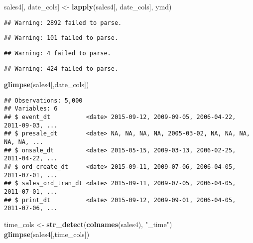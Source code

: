 \documentclass[]{article}
\newenvironment{Shaded}{\begin{snugshade}}{\end{snugshade}}
\newcommand{\KeywordTok}[1]{\textcolor[rgb]{0.13,0.29,0.53}{\textbf{#1}}}
\newcommand{\NormalTok}[1]{#1}
\newcommand{\StringTok}[1]{\textcolor[rgb]{0.31,0.60,0.02}{#1}}
\begin{document}
\begin{Shaded}
\begin{Highlighting}[]
\NormalTok{sales4[, date_cols] <-}\StringTok{ }\KeywordTok{lapply}\NormalTok{(sales4[, date_cols], ymd)}
\end{Highlighting}
\end{Shaded}

\begin{verbatim}
## Warning: 2892 failed to parse.
\end{verbatim}

\begin{verbatim}
## Warning: 101 failed to parse.
\end{verbatim}

\begin{verbatim}
## Warning: 4 failed to parse.
\end{verbatim}

\begin{verbatim}
## Warning: 424 failed to parse.
\end{verbatim}

\begin{Shaded}
\begin{Highlighting}[]
\KeywordTok{glimpse}\NormalTok{(sales4[,date_cols])}
\end{Highlighting}
\end{Shaded}

\begin{verbatim}
## Observations: 5,000
## Variables: 6
## $ event_dt          <date> 2015-09-12, 2009-09-05, 2006-04-22, 2011-09-03, ...
## $ presale_dt        <date> NA, NA, NA, NA, 2005-03-02, NA, NA, NA, NA, NA, ...
## $ onsale_dt         <date> 2015-05-15, 2009-03-13, 2006-02-25, 2011-04-22, ...
## $ ord_create_dt     <date> 2015-09-11, 2009-07-06, 2006-04-05, 2011-07-01, ...
## $ sales_ord_tran_dt <date> 2015-09-11, 2009-07-05, 2006-04-05, 2011-07-01, ...
## $ print_dt          <date> 2015-09-12, 2009-09-01, 2006-04-05, 2011-07-06, ...
\end{verbatim}

\begin{Shaded}
\begin{Highlighting}[]
\NormalTok{time_cols <-}\StringTok{ }\KeywordTok{str_detect}\NormalTok{(}\KeywordTok{colnames}\NormalTok{(sales4), }\StringTok{"_time"}\NormalTok{)}
\KeywordTok{glimpse}\NormalTok{(sales4[,time_cols])}
\end{Highlighting}
\end{Shaded}
\end{document}
